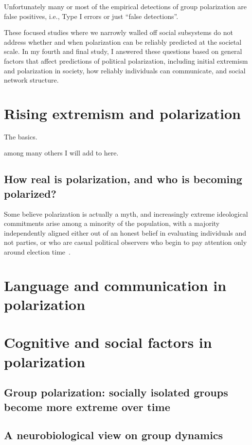 \documentclass[12pt,letterpaper]{article}
\begin{document}
Unfortunately many or most of the empirical detections of group polarization
are false positives, i.e., Type I errors or just ``false detections''. 

These focused studies where we narrowly walled off social subsystems do not
address whether and when polarization can be reliably predicted at the
societal scale. In my fourth and final study, I answered these questions
based on general factors that affect predictions of political polarization, 
including initial extremism and polarization in society, how reliably individuals
can communicate, and social network structure. 


\section{Rising extremism and polarization}

The basics.

 among many others I will add to here.


\subsection{How real is polarization, and who is becoming polarized?}

Some believe polarization is actually a myth, and increasingly 
extreme ideological commitments arise among a minority of the population,
with a majority independently aligned either out of an honest belief in 
evaluating individuals and not parties, or who are casual political
observers who begin to pay attention only around election time~\cite{Kinder2017}.


\section{Language and communication in polarization}



\section{Cognitive and social factors in polarization}


\subsection{Group polarization: socially isolated groups become more extreme over time}


\subsection{A neurobiological view on group dynamics}
\end{document}
